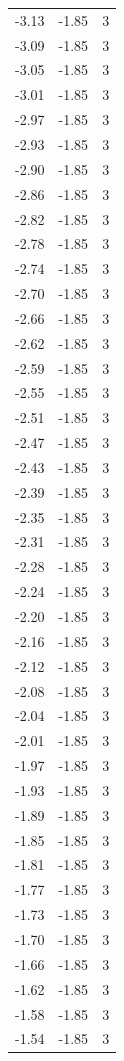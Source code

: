 \begin{longtable}{lrr}
  -3.13 & -1.85 & 3 \\
  -3.09 & -1.85 & 3 \\
  -3.05 & -1.85 & 3 \\
  -3.01 & -1.85 & 3 \\
  -2.97 & -1.85 & 3 \\
  -2.93 & -1.85 & 3 \\
  -2.90 & -1.85 & 3 \\
  -2.86 & -1.85 & 3 \\
  -2.82 & -1.85 & 3 \\
  -2.78 & -1.85 & 3 \\
  -2.74 & -1.85 & 3 \\
  -2.70 & -1.85 & 3 \\
  -2.66 & -1.85 & 3 \\
  -2.62 & -1.85 & 3 \\
  -2.59 & -1.85 & 3 \\
  -2.55 & -1.85 & 3 \\
  -2.51 & -1.85 & 3 \\
  -2.47 & -1.85 & 3 \\
  -2.43 & -1.85 & 3 \\
  -2.39 & -1.85 & 3 \\
  -2.35 & -1.85 & 3 \\
  -2.31 & -1.85 & 3 \\
  -2.28 & -1.85 & 3 \\
  -2.24 & -1.85 & 3 \\
  -2.20 & -1.85 & 3 \\
  -2.16 & -1.85 & 3 \\
  -2.12 & -1.85 & 3 \\
  -2.08 & -1.85 & 3 \\
  -2.04 & -1.85 & 3 \\
  -2.01 & -1.85 & 3 \\
  -1.97 & -1.85 & 3 \\
  -1.93 & -1.85 & 3 \\
  -1.89 & -1.85 & 3 \\
  -1.85 & -1.85 & 3 \\
  -1.81 & -1.85 & 3 \\
  -1.77 & -1.85 & 3 \\
  -1.73 & -1.85 & 3 \\
  -1.70 & -1.85 & 3 \\
  -1.66 & -1.85 & 3 \\
  -1.62 & -1.85 & 3 \\
  -1.58 & -1.85 & 3 \\
  -1.54 & -1.85 & 3 \\

\end{longtable}
